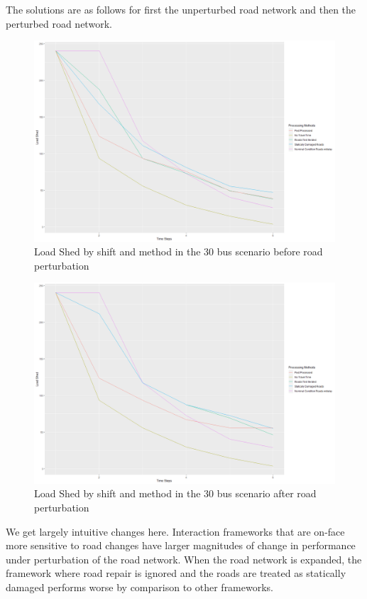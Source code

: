\documentclass{article}
\begin{document}
	The solutions are as follows for first the unperturbed road network and then the perturbed road network.
	
	\begin{figure}[H]
		\centering
		\includegraphics[width=.9\linewidth]{Rplot30Unperturbed.png}
		\caption{Load Shed by shift and method in the 30 bus scenario before road perturbation}
		\label{fig:sub2}
		
		
	\end{figure}
	\begin{figure}[H]
	\centering
	\includegraphics[width=.9\linewidth]{Rplot30Perturbed.png}
	\caption{Load Shed by shift and method in the 30 bus scenario after road perturbation}
	\label{fig:sub2}
	
	
	\end{figure}
	
		We get largely intuitive changes here. Interaction frameworks that are on-face more sensitive to road changes have larger magnitudes of change in performance under perturbation of the road network. When the road network is expanded, the framework where road repair is ignored and the roads are treated as statically damaged performs worse by comparison to other frameworks.
	
\end{document}
